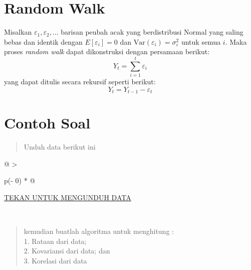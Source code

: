 \documentclass[
]{book}
\begin{document}
\hypertarget{random-walk}{%
\section{Random Walk}\label{random-walk}}

Misalkan \(\varepsilon_1,\varepsilon_2, \dots\) barisan peubah acak yang berdistribusi Normal yang saling bebas dan identik dengan \(E[\varepsilon_i]=0\) dan \(\text{Var}(\varepsilon_i) =\sigma^2_\varepsilon\) untuk semua \(i\). Maka proses \emph{random walk} dapat dikonstruksi dengan persamaan berikut:
\begin{equation}
Y_t = \sum_{i=1}^t \varepsilon_i \label{eq:rw}
\end{equation}
yang dapat ditulis secara rekursif seperti berikut:
\begin{equation}
Y_t = Y_{t-1} - \varepsilon_t
\end{equation}

\hypertarget{contoh-soal}{%
\section{Contoh Soal}\label{contoh-soal}}

\begin{quote}
Unduh data berikut ini
\end{quote}

\begin{longtable}[]{@{}
  >{\raggedright\arraybackslash}p{(\columnwidth - 0\tabcolsep) * }@{}}
\toprule\noalign{}
\begin{minipage}[b]{\linewidth}\raggedright
\href{https://drive.google.com/uc?export=download\&id=1zevgGmfz87MJYn8OuIX5FEBgypR-DWnG}{TEKAN UNTUK MENGUNDUH DATA}
\end{minipage} \\
\midrule\noalign{}
\endhead
\bottomrule\noalign{}
\endlastfoot
\end{longtable}

\begin{quote}
kemudian buatlah algoritma untuk menghitung :\\
1. Rataan dari data;\\
2. Kovariansi dari data; dan\\
3. Korelasi dari data
\end{quote}
\end{document}

